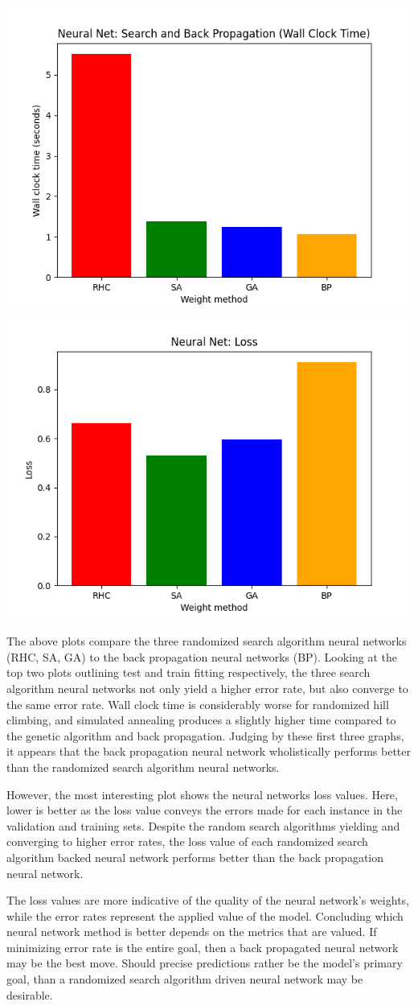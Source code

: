 \documentclass{article}
\begin{document}
\begin{center}
    \includegraphics[width=.49\linewidth]{neural_time.png}
    \includegraphics[width=.49\linewidth]{neural_loss.png}
\end{center}

The above plots compare the three randomized search algorithm neural networks (RHC, SA, GA) to the back propagation neural networks (BP). Looking at the top two plots outlining test and train fitting respectively, the three search algorithm neural networks not only yield a higher error rate, but also converge to the same error rate. Wall clock time is considerably worse for randomized hill climbing, and simulated annealing produces a slightly higher time compared to the genetic algorithm and back propagation. Judging by these first three graphs, it appears that the back propagation neural network wholistically performs better than the randomized search algorithm neural networks.

However, the most interesting plot shows the neural networks loss values. Here, lower is better as the loss value conveys the errors made for each instance in the validation and training sets. Despite the random search algorithms yielding and converging to higher error rates, the loss value of each randomized search algorithm backed neural network performs better than the back propagation neural network.

The loss values are more indicative of the quality of the neural network's weights, while the error rates represent the applied value of the model. Concluding which neural network method is better depends on the metrics that are valued. If minimizing error rate is the entire goal, then a back propagated neural network may be the best move. Should precise predictions rather be the model's primary goal, than a randomized search algorithm driven neural network may be desirable.
\end{document}
